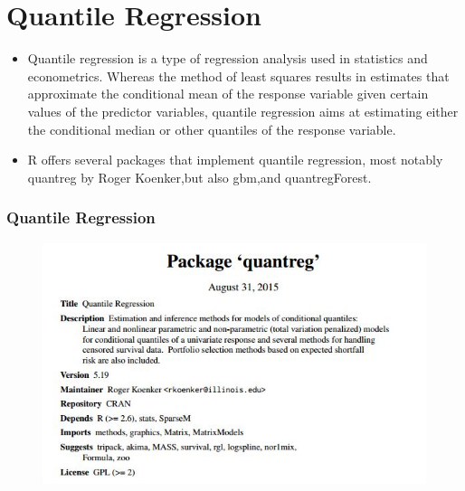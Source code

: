 \documentclass{beamer}
\begin{document}
\section{Quantile Regression}
\begin{frame}
	\begin{itemize}
\item 	Quantile regression is a type of regression analysis used in statistics and econometrics. Whereas the method of least squares results in estimates that approximate the conditional mean of the response variable given certain values of the predictor variables, quantile regression aims at estimating either the conditional median or other quantiles of the response variable.
	
\item 	R offers several packages that implement quantile regression, most notably quantreg by Roger Koenker,but also gbm,and quantregForest.
	\end{itemize}

\end{frame}

\begin{frame}
\frametitle{Quantile Regression}
\large
	\begin{figure}
\centering
\includegraphics[width=0.7\linewidth]{images/CRAN-quantreg}

\end{figure}

\end{frame}
\end{document}
